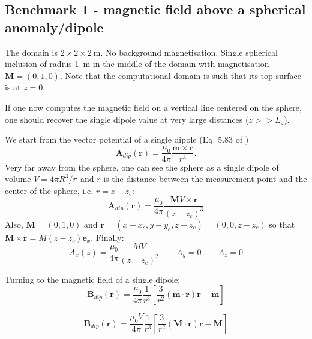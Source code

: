 \subsection*{Benchmark 1 - magnetic field above a spherical anomaly/dipole}


The domain is $2\times 2\times 2~\si{\meter}$. No background magnetisation. Single spherical inclusion 
of radius \SI{1}{\meter} in the middle of the domain with magnetisation ${\bm M}=(0,1,0)$. 
Note that the computational domain is such that its top surface is at $z=0$.

If one now computes the magnetic field on a vertical line centered on the sphere, one 
should recover the single dipole value at very large distances ($z>>L_z$). 

We start from the vector potential of a single dipole (Eq. 5.83 of \cite{griffiths}) 
\[
{\bm A}_{dip}({\bm r}) = \frac{\mu_0}{4\pi} \frac{{\bm m}\times {\bm r}}{r^3}.
\]
Very far away from the sphere, one can see the sphere as a single dipole of volume $V=4\pi R^3/\pi$
and $r$ is the distance between the measurement point and the center of the sphere, i.e. $r=z-z_c$:
\[
{\bm A}_{dip}({\bm r}) = \frac{\mu_0}{4\pi} \frac{{\bm M} V\times {\bm r}}{(z-z_c)^3}
\]
Also, ${\bm M}=(0,1,0)$ and ${\bm r}=(x-x_c,y-y_c,z-z_c)=(0,0,z-z_c)$ so that ${\bm M}\times {\bm r}=M (z-z_c) {\bm e}_x$.
Finally:
\[
A_x(z)=\frac{\mu_0}{4\pi} \frac{MV}{(z-z_c)^2}  \quad\quad
A_y=0 \quad\quad
A_z=0
\]



Turning to the magnetic field of a single dipole:
\[
{\bm B}_{dip}({\bm r}) = \frac{\mu_0}{4\pi} \frac{1}{r^3} \left[ \frac{3}{r^2} ({\bm m} \cdot {\bm r}) {\bm r} - {\bm m}\right]
\]

\[
{\bm B}_{dip}({\bm r}) = \frac{\mu_0 V}{4\pi} \frac{1}{r^3} \left[ \frac{3}{r^2} ({\bm M} \cdot {\bm r}) {\bm r} - {\bm M}\right]
\]

